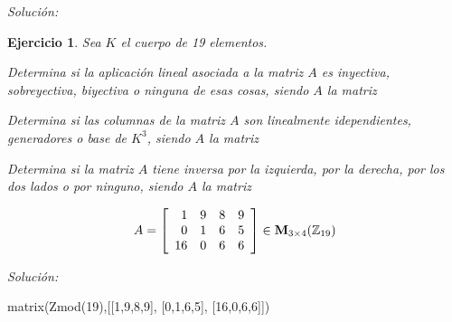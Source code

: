 \documentclass[12pt]{amsart}
\newtheorem{ejer}{Ejercicio}
\begin{document}
{\it Soluci\'on:}



\begin{ejer} Sea $K$ el cuerpo de 19 elementos.
\newline
\noindent\begin{minipage}{\textwidth}
\begin{tcolorbox}[colback = green!20!white,title=Versión Aplicaciones]
Determina si la aplicaci\'on lineal asociada a la matriz $A$ es inyectiva, sobreyectiva, biyectiva o ninguna de esas cosas, siendo $A$ la matriz \end{tcolorbox}
\end{minipage} \newline
\noindent\begin{minipage}{\textwidth}
\begin{tcolorbox}[colback = blue!20!white,title=Versión Vectores]
Determina si las columnas de la matriz $A$ son linealmente idependientes, generadores o base de $K^{3}$, siendo $A$ la matriz \end{tcolorbox}
\end{minipage} \newline
\noindent\begin{minipage}{\textwidth} 
\begin{tcolorbox}[colback = red!20!white,title=Versión Inversas]
Determina si la matriz $A$ tiene inversa por la izquierda, por la derecha, por los dos lados o por ninguno, siendo $A$ la matriz 
\end{tcolorbox}
\end{minipage}
\[ A = \left[\begin{array}{rrrr}
1 & 9 & 8 & 9 \\
0 & 1 & 6 & 5 \\
16 & 0 & 6 & 6
\end{array}\right] \in {\bf M}_{3\times 4}({\mathbb Z}_{19})\]
\end{ejer}

{\it Soluci\'on:}

\begin{sageblock}
matrix(Zmod(19),[[1,9,8,9],
[0,1,6,5],
[16,0,6,6]])
\end{sageblock}

\end{document}

